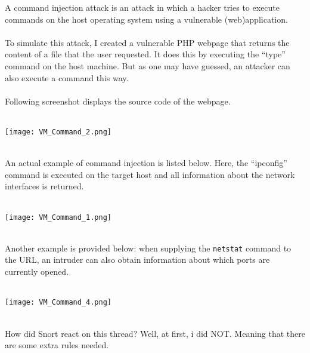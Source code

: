 A command injection attack is an attack in which a hacker tries to execute commands on the host operating system using a vulnerable (web)application. \\ \\
To simulate this attack, I created a vulnerable PHP webpage that returns the content of a file that the user requested. It does this by executing the ``type'' command on the host machine. But as one may have guessed, an attacker can also execute a command this way.  \\ \\
Following screenshot displays the source code of the webpage.$\;$ \\ \\
\noindent\begin{minipage}{\textwidth}
    \centering
    \texttt{[image: VM\_Command\_2.png]}
\end{minipage}
$\;$ \\ \\
An actual example of command injection is listed below. Here, the ``ipconfig'' command is executed on the target host and all information about the network interfaces is returned.
$\;$ \\ \\
\noindent\begin{minipage}{\textwidth}
    \centering
    \texttt{[image: VM\_Command\_1.png]}
\end{minipage}
$\;$ \\ \\
Another example is provided below: when supplying the \texttt{netstat} command to the URL, an intruder can also obtain information about which ports are currently opened.
$\;$ \\ \\
\noindent\begin{minipage}{\textwidth}
    \centering
    \texttt{[image: VM\_Command\_4.png]}
\end{minipage}
$\;$ \\ \\
How did Snort react on this thread? Well, at first, i did NOT. Meaning that there are some extra rules needed.
